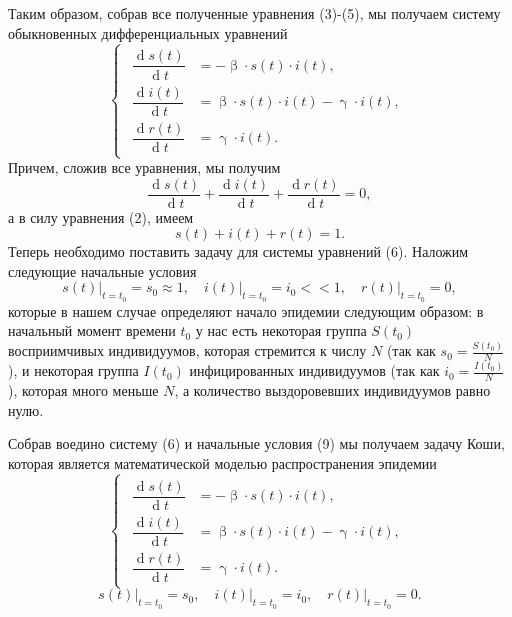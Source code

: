 \documentclass[a4paper, 12pt]{extarticle}
\numberwithin{equation}{section}
\renewcommand{\beta}{\upbeta}
\renewcommand{\gamma}{\upgamma}
\renewcommand{\d}{\operatorname{d}}
\begin{document}
	Таким образом, собрав все полученные уравнения (3)-(5), мы получаем систему обыкновенных дифференциальных уравнений
	\begin{equation}
		\left\{ 
		\begin{gathered} 
			\begin{aligned}
				\dfrac {\d s(t)}{\d t} &= -\beta \cdot s(t) \cdot i(t),\\
				\dfrac{\d i(t)}{\d t} &= \beta \cdot s(t)\cdot i(t) - \gamma\cdot i(t),\\
				\dfrac{\d r(t)}{\d t} &= \gamma\cdot i(t). 
			\end{aligned}
		\end{gathered} 
		\right.		
	\end{equation}
	Причем, сложив все уравнения, мы получим 
	\begin{equation}
		\dfrac {\d s(t)}{\d t} + \dfrac {\d i(t)}{\d t} + \dfrac {\d r(t)}{\d t} = 0,
	\end{equation}
	а в силу уравнения (2), имеем 
	\begin{equation}
		s(t) + i(t) + r(t) = 1.
	\end{equation}
	Теперь необходимо поставить задачу для системы уравнений (6). Наложим следующие начальные условия 
	\begin{equation}
		s(t)\Big|_{t=t_0} = s_0 \approx 1,\quad i(t)\Big|_{t=t_0} = i_0 << 1,\quad r(t)\Big|_{t=t_0} = 0,
	\end{equation}
	которые в нашем случае определяют начало эпидемии следующим образом: в начальный момент времени $t_0$ у нас есть некоторая группа $S(t_0)$ восприимчивых индивидуумов, которая стремится к числу $N$ (так как $s_0 = \frac{S(t_0)}N$), и некоторая группа $I(t_0)$ инфицированных индивидуумов (так как $i_0 = \frac{I(t_0)}N$), которая много меньше $N$, а количество выздоровевших индивидуумов равно нулю.
	
	Собрав воедино систему (6) и начальные условия (9) мы получаем задачу Коши, которая является математической моделью распространения эпидемии 
	$$
	\left\{ 
	\begin{gathered} 
		\begin{aligned}
			\dfrac {\d s(t)}{\d t} &= -\beta \cdot s(t) \cdot i(t),\\
			\dfrac{\d i(t)}{\d t} &= \beta \cdot s(t)\cdot i(t) - \gamma\cdot i(t),\\
			\dfrac{\d r(t)}{\d t} &= \gamma\cdot i(t). 
		\end{aligned}
	\end{gathered} 
	\right.
	$$
	$$
	s(t)\Big|_{t=t_0} = s_0,\quad i(t)\Big|_{t=t_0} = i_0,\quad r(t)\Big|_{t=t_0} = 0.
	$$
\end{document}
